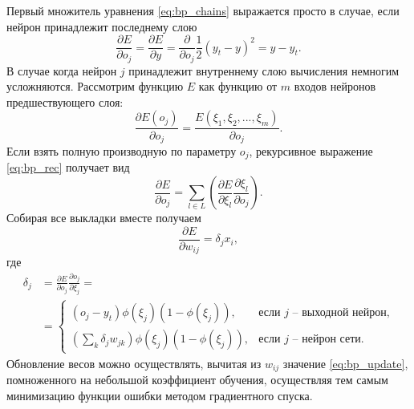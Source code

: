 \documentclass[a4paper,10pt]{article}
\begin{document}
Первый множитель уравнения \eqref{eq:bp_chains} выражается просто в случае, если нейрон принадлежит последнему слою
\begin{equation}
\frac{\partial E}{\partial o_{j}} = \frac{\partial E}{\partial y} = \frac{\partial}{\partial o_{j}} \frac{1}{2} (y_{t}-y)^2 = y - y_{t}  .
\end{equation}
В случае когда нейрон $j$ принадлежит внутреннему слою вычисления немногим усложняются. Рассмотрим функцию $E$ как функцию от $m$ входов нейронов предшествующего слоя:
\begin{equation}\label{eq:bp_rec}
\frac{\partial E(o_{j})}{\partial o_{j}} = \frac{E(\xi_{1}, \xi_{2},...,\xi_{m})}{\partial o_{j}}.
\end{equation}
Если взять полную производную по параметру $o_{j}$, рекурсивное выражение \eqref{eq:bp_rec} получает вид
\begin{equation}
\frac{\partial E}{\partial o_{j}} = \sum_{l\in L}\left(\frac{\partial E}{\partial \xi_{l}} \frac{\partial \xi_{l}}{\partial o_{j}}\right).
\end{equation}
\indent Собирая все выкладки вместе получаем
\begin{equation}\label{eq:bp_update}
\frac{\partial E}{\partial w_{ij}} = \delta_{j} x_{i},
\end{equation}
где
\begin{equation}
\begin{split}
\delta_{j} &= \frac{\partial E}{\partial o_{j}} \frac{\partial o_{j}}{\partial \xi_{j}} = \\ &=\begin{cases} (o_{j}-y_{t}) \phi(\xi_{j})(1-\phi(\xi_{j})), & \mbox{если }j\mbox{ -- выходной нейрон,} \\ (\sum_{k}\delta_{j}w_{jk})\phi(\xi_{j})(1-\phi(\xi_{j})), & \mbox{если }j\mbox{ -- нейрон сети.} \end{cases}
\end{split}
\end{equation}
\indent Обновление весов можно осуществлять, вычитая из $w_{ij}$ значение \eqref{eq:bp_update}, помноженного на небольшой коэффициент обучения, осуществляя тем самым минимизацию функции ошибки методом градиентного спуска.
\end{document}
